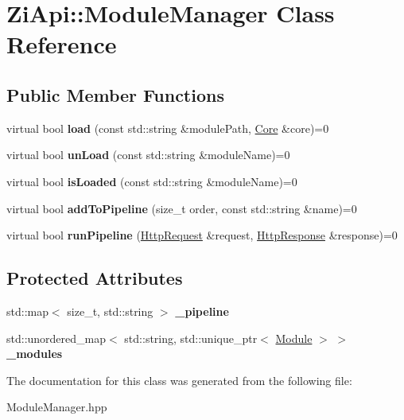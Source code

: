 \hypertarget{classZiApi_1_1ModuleManager}{}\section{Zi\+Api\+::Module\+Manager Class Reference}
\label{classZiApi_1_1ModuleManager}
\subsection*{Public Member Functions}
\begin{DoxyCompactItemize}
\item 
\mbox{\label{classZiApi_1_1ModuleManager_a073ad69fd2dd2d4f07ed6c82fdf212e2}} 
virtual bool {\bfseries load} (const std\+::string \&module\+Path, \mbox{\hyperlink{classZiApi_1_1Core}{Core}} \&core)=0
\item 
\mbox{\label{classZiApi_1_1ModuleManager_a85b509cc930443012d901be5d4a2ad30}} 
virtual bool {\bfseries un\+Load} (const std\+::string \&module\+Name)=0
\item 
\mbox{\label{classZiApi_1_1ModuleManager_a15de426ee9f5739296a79b39a5f4abc8}} 
virtual bool {\bfseries is\+Loaded} (const std\+::string \&module\+Name)=0
\item 
\mbox{\label{classZiApi_1_1ModuleManager_a204f11d5cbdb9cd18890eb370aebe019}} 
virtual bool {\bfseries add\+To\+Pipeline} (size\+\_\+t order, const std\+::string \&name)=0
\item 
\mbox{\label{classZiApi_1_1ModuleManager_aa45c0a9694ec4d3dfd2b2ab77bb623c4}} 
virtual bool {\bfseries run\+Pipeline} (\mbox{\hyperlink{classZiApi_1_1HttpRequest}{Http\+Request}} \&request, \mbox{\hyperlink{classZiApi_1_1HttpResponse}{Http\+Response}} \&response)=0
\end{DoxyCompactItemize}
\subsection*{Protected Attributes}
\begin{DoxyCompactItemize}
\item 
\mbox{\label{classZiApi_1_1ModuleManager_a9419290c9405733c97e8bdea9095b0f0}} 
std\+::map$<$ size\+\_\+t, std\+::string $>$ {\bfseries \+\_\+pipeline}
\item 
\mbox{\label{classZiApi_1_1ModuleManager_a14887a7947963cbd29390a1951895af5}} 
std\+::unordered\+\_\+map$<$ std\+::string, std\+::unique\+\_\+ptr$<$ \mbox{\hyperlink{classZiApi_1_1Module}{Module}} $>$ $>$ {\bfseries \+\_\+modules}
\end{DoxyCompactItemize}


The documentation for this class was generated from the following file\+:\begin{DoxyCompactItemize}
\item 
Module\+Manager.\+hpp\end{DoxyCompactItemize}

